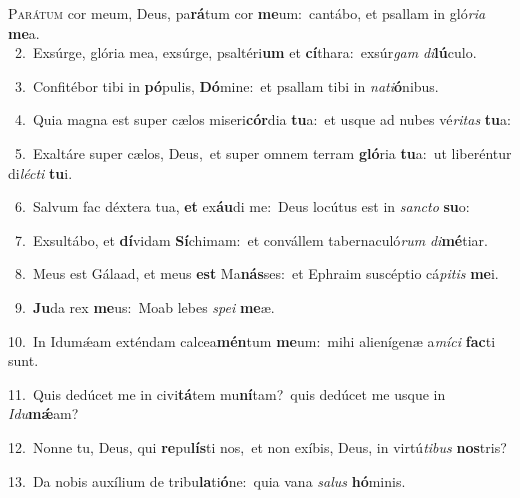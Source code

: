 \lettrine{\initial\textcolor{\initialcolor}{P}}{arátum} cor meum, Deus, pa\-\textbf{rá}\-tum cor \textbf{me}\-um:~\star cantábo, et psallam in gló\-\textit{ri}\-\textit{a} \textbf{me}\-a.\\
{\numbfont\textcolor{\numbcolor}{~2.}}~Exsúrge, glória mea, exsúrge, psaltéri\textbf{um} et \textbf{cí}\-thara:~\star exsúr\textit{gam} \textit{di}\-\textbf{lú}culo.\par
{\numbfont\textcolor{\numbcolor}{~3.}}~Confitébor tibi in \textbf{pó}\-pulis, \textbf{Dó}\-mine:~\star et psallam tibi in \textit{na}\-\textit{ti}\textbf{ó}nibus.\par
{\numbfont\textcolor{\numbcolor}{~4.}}~Quia magna est super cælos miseri\-\textbf{cór}\-dia \textbf{tu}\-a:~\star et usque ad nubes vé\-\textit{ri}\-\textit{tas} \textbf{tu}\-a:\par
{\numbfont\textcolor{\numbcolor}{~5.}}~Exaltáre super cælos, Deus,~\dagger et super omnem terram \textbf{gló}\-ria \textbf{tu}\-a:~\star ut liberéntur di\-\textit{léc}\-\textit{ti} \textbf{tu}\-i.\par
{\numbfont\textcolor{\numbcolor}{~6.}}~Salvum fac déxtera tua, \textbf{et} ex\-\textbf{áu}\-di me:~\star Deus locútus est in \textit{sanc}\-\textit{to} \textbf{su}\-o:\par
{\numbfont\textcolor{\numbcolor}{~7.}}~Exsultábo, et \textbf{dí}\-vidam \textbf{Sí}\-chimam:~\star et convállem tabernaculó\textit{rum} \textit{di}\-\textbf{mé}tiar.\par
{\numbfont\textcolor{\numbcolor}{~8.}}~Meus est Gálaad, et meus \textbf{est} Ma\-\textbf{nás}\-ses:~\star et Ephraim suscéptio cá\-\textit{pi}\-\textit{tis} \textbf{me}\-i.\par
{\numbfont\textcolor{\numbcolor}{~9.}}~\-\textbf{Ju}\-da rex \textbf{me}\-us:~\star Moab lebes \textit{spe}\-\textit{i} \textbf{me}\-æ.\par
{\numbfont\textcolor{\numbcolor}{10.}}~In Idumǽam exténdam calcea\-\textbf{mén}\-tum \textbf{me}\-um:~\star mihi alienígenæ a\-\textit{mí}\-\textit{ci} \textbf{fac}\-ti sunt.\par
{\numbfont\textcolor{\numbcolor}{11.}}~Quis dedúcet me in civi\-\textbf{tá}\-tem mu\-\textbf{ní}\-tam?~\star quis dedúcet me usque in \textit{I}\-\textit{du}\textbf{mǽ}am?\par
{\numbfont\textcolor{\numbcolor}{12.}}~Nonne tu, Deus, qui \textbf{re}\-pu\-\textbf{lís}\-ti nos,~\star et non exíbis, Deus, in virtú\-\textit{ti}\-\textit{bus} \textbf{nos}\-tris?\par
{\numbfont\textcolor{\numbcolor}{13.}}~Da nobis auxílium de tribu\-\textbf{la}\-ti\-\textbf{ó}\-ne:~\star quia vana \textit{sa}\-\textit{lus} \textbf{hó}\-minis.\par
